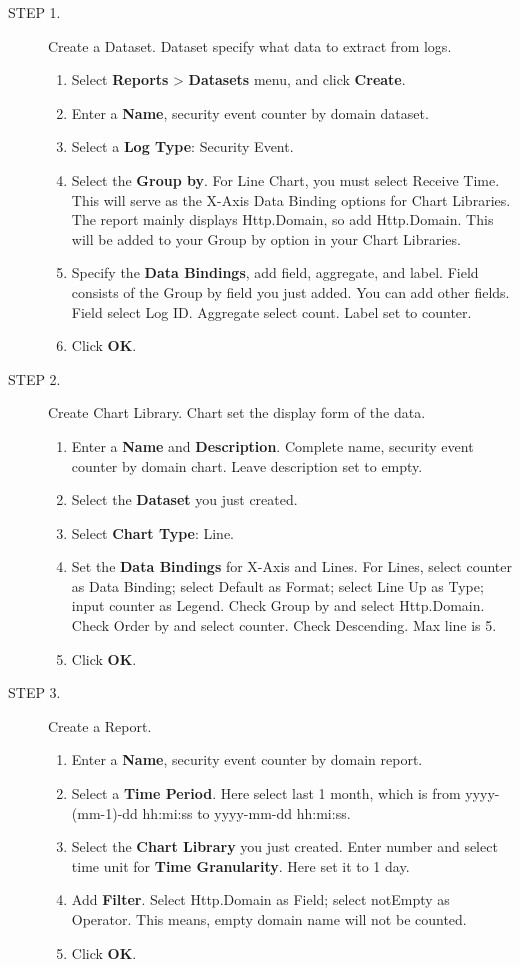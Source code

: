 \begin{description}
    \item[STEP 1.]	Create a Dataset. Dataset specify what data to extract from logs.
    \begin{enumerate}
        \item Select \textbf{Reports} > \textbf{Datasets} menu, and click \textbf{Create}.
        \item Enter a \textbf{Name}, security event counter by domain dataset.
        \item Select a \textbf{Log Type}: Security Event.
        \item Select the \textbf{Group by}. For Line Chart, you must select Receive Time. This will serve as the X-Axis Data Binding options for Chart Libraries. The report mainly displays Http.Domain, so add Http.Domain. This will be added to your Group by option in your Chart Libraries.
        \item Specify the \textbf{Data Bindings}, add field, aggregate, and label. Field consists of the Group by field you just added. You can add other fields. Field select Log ID. Aggregate select count. Label set to counter.
        \item Click \textbf{OK}.
    \end{enumerate}
    \item[STEP 2.]	Create Chart Library. Chart set the display form of the data.
    \begin{enumerate}
        \item Enter a \textbf{Name} and \textbf{Description}. Complete name, security event counter by domain chart. Leave description set to empty.
        \item Select the \textbf{Dataset} you just created.
        \item Select \textbf{Chart Type}: Line. 
        \item Set the \textbf{Data Bindings} for X-Axis and Lines. For Lines, select counter as Data Binding; select Default as Format; select Line Up as Type; input counter as Legend. Check Group by and select Http.Domain. Check Order by and select counter. Check Descending. Max line is 5.
        \item Click \textbf{OK}.
    \end{enumerate}
    \item[STEP 3.]	Create a Report. 
    \begin{enumerate}
        \item Enter a \textbf{Name}, security event counter by domain report.
        \item Select a \textbf{Time Period}. Here select last 1 month, which is from yyyy-(mm-1)-dd hh:mi:ss to yyyy-mm-dd hh:mi:ss.
        \item Select the \textbf{Chart Library} you just created. Enter number and select time unit for \textbf{Time Granularity}. Here set it to 1 day.
        \item Add \textbf{Filter}. Select Http.Domain as Field; select notEmpty as Operator. This means, empty domain name will not be counted.
        \item Click \textbf{OK}.
    \end{enumerate}
\end{description}

